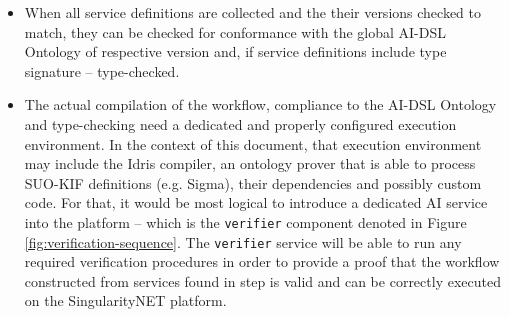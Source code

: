 \documentclass[]{report}
\begin{document}
\begin{enumerate}
\begin{itemize}
	\begin{figure}[h]
		\centering
		\begin{verbatim}
		{
			"sender": "uclnlp",
			"receiver": "fakeNewsScore",
			"upper-ai-dsl-ontology": "v0.1",
			"service-metadata": $(include sevice_definition.json),
			"leaf-ontology": $(include uclnlp.kif)
		}
		\end{verbatim}
		\vspace{-0.3cm}
		\captionsetup{width=0.8\linewidth}
		\caption{\label{lst:uclnlp_metadata}Metadata of the \texttt{uclnlp} service. Sample contents 
			of included files can be seen separately for each  
			\href{https://gitlab.com/nunet/fake-news-detection/uclnlp/-/blob/master/service/service_spec/service_definition_prod.json}{service\_definition.json}
			and \href{https://github.com/singnet/ai-dsl/blob/master/ontology/uclnlp.kif}{uclnlp.kif}.
		}
	\end{figure}

	\item When all service definitions are collected and the their versions checked to match, 
	they can be checked for conformance with the global AI-DSL Ontology of respective version and,
	if service definitions include type signature -- type-checked.
	
	\item The actual compilation of the workflow, compliance to
          the AI-DSL Ontology and type-checking need a
	dedicated and properly configured execution environment. In the context of this document, 
	that execution environment may include the Idris compiler, an ontology prover that is able to process 
	SUO-KIF definitions (e.g. Sigma), their dependencies and possibly custom code.
	For that, it would be most logical to introduce a dedicated
	AI service into the platform -- which is the \texttt{verifier} component denoted in Figure 
	\ref{fig:verification-sequence}. The \texttt{verifier} service will be able to run any required
	verification procedures in order to provide a proof that the workflow constructed from 
	services found in step  is valid and can be correctly executed on the 
	SingularityNET platform.


\end{itemize}
\end{enumerate}
\end{document}
